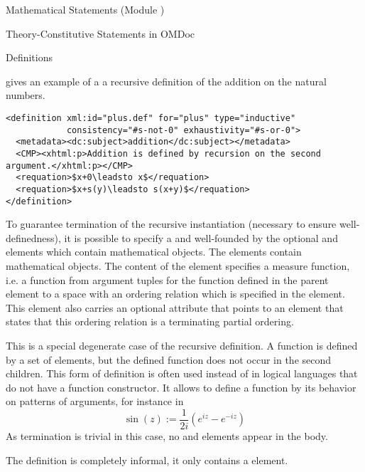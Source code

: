 \begin{tchapter}[id=statements,short=Mathematical Statements]{Mathematical Statements (Module {})}
\begin{tsection}[id=definitions]{Theory-Constitutive Statements in OMDoc}
\begin{tsubsection}[id=definitions]{Definitions}
\begin{description}
  {} gives an example of a a recursive definition of
  the addition on the natural numbers.
\begin{lstlisting}[label=lst:recursive,mathescape,
  caption={A recursive definition of addition},
  index={definition,requation}]
<definition xml:id="plus.def" for="plus" type="inductive" 
            consistency="#s-not-0" exhaustivity="#s-or-0">
  <metadata><dc:subject>addition</dc:subject></metadata>
  <CMP><xhtml:p>Addition is defined by recursion on the second argument.</xhtml:p></CMP>
  <requation>$x+0\leadsto x$</requation>
  <requation>$x+s(y)\leadsto s(x+y)$</requation>
</definition>
\end{lstlisting}
To guarantee termination of the recursive instantiation (necessary to ensure
  well-definedness), it is possible to specify a {} and
  well-founded {} by the optional {} and
  {} elements which contain mathematical objects. The elements contain
  mathematical objects. The content of the {} element specifies a measure
  function, i.e. a function from argument tuples for the function defined in the parent
  {} element to a space with an ordering relation which is specified
  in the {} element. This element also carries an optional attribute
  {} that points to an {} element that states
  that this ordering relation is a terminating partial ordering.
\item[{\attval{pattern}{type}{definition}}] This is a special degenerate case of the
  recursive definition. A function is defined by a set of {} elements,
  but the defined function does not occur in the second children. This form of definition
  is often used instead of {} in logical languages that
  do not have a function constructor. It allows to define a function by its behavior on
  patterns of arguments, for instance in 
  \[\sin(z) := \frac{1}{2i}(e^{iz}-e^{-iz})\]
  As termination is trivial in this case, no {} and {}
  elements appear in the body.
\item[{\attval{informal}{type}{definition}}] The definition is completely informal, it
  only contains a {} element.
\end{description}
\end{tsubsection}
\end{tsection}


\end{tchapter}
